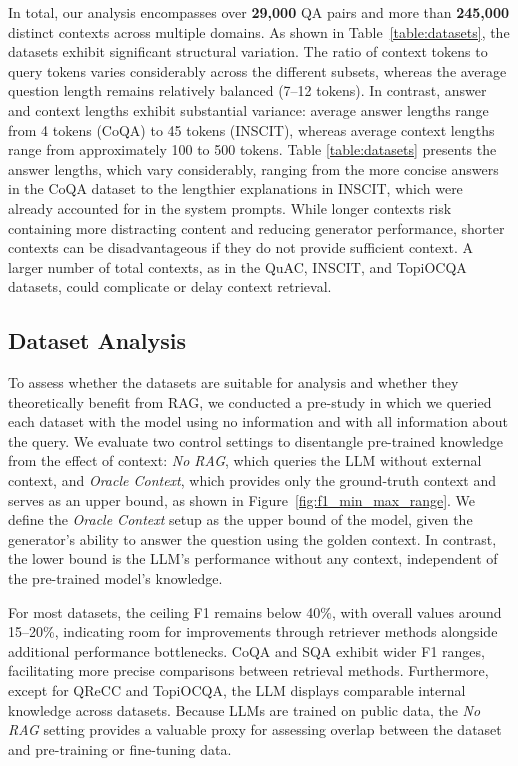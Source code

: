 \documentclass[11pt]{article}
\begin{document}
In total, our analysis encompasses over \textbf{29,000} QA pairs and more than \textbf{245,000 } distinct contexts across multiple domains. As shown in Table~\ref{table:datasets}, the datasets exhibit significant structural variation. The ratio of context tokens to query tokens varies considerably across the different subsets, whereas the average question length remains relatively balanced (7--12 tokens). In contrast, answer and context lengths exhibit substantial variance: average answer lengths range from 4 tokens (CoQA) to 45 tokens (INSCIT), whereas average context lengths range from approximately 100 to 500 tokens. 
Table \ref{table:datasets} presents the answer lengths, which vary considerably, ranging from the more concise answers in the CoQA dataset to the lengthier explanations in INSCIT, which were already accounted for in the system prompts.
While longer contexts risk containing more distracting content and reducing generator performance, shorter contexts can be disadvantageous if they do not provide sufficient context. 
A larger number of total contexts, as in the QuAC, INSCIT, and TopiOCQA datasets, could complicate or delay context retrieval. 

\subsection{Dataset Analysis} \label{sec:preliminary analysis}
To assess whether the datasets are suitable for analysis and whether they theoretically benefit from RAG, we conducted a pre-study in which we queried each dataset with the model using no information and with all information about the query.
We evaluate two control settings to disentangle pre-trained knowledge from the effect of context: \textit{No RAG}, which queries the LLM without external context, and \textit{Oracle Context}, which provides only the ground-truth context and serves as an upper bound, as shown in Figure~\ref{fig:f1_min_max_range}. 
We define the \textit{Oracle Context} setup as the upper bound of the model, given the generator's ability to answer the question using the golden context. 
In contrast, the lower bound is the LLM’s performance without any context, independent of the pre-trained model's knowledge.

For most datasets, the ceiling F1 remains below 40\%, with overall values around 15–20\%, indicating room for improvements through retriever methods alongside additional performance bottlenecks. CoQA and SQA exhibit wider F1 ranges, facilitating more precise comparisons between retrieval methods.
Furthermore, except for QReCC and TopiOCQA, the LLM displays comparable internal knowledge across datasets. Because LLMs are trained on public data, the \textit{No RAG} setting provides a valuable proxy for assessing overlap between the dataset and pre-training or fine-tuning data.
\end{document}
